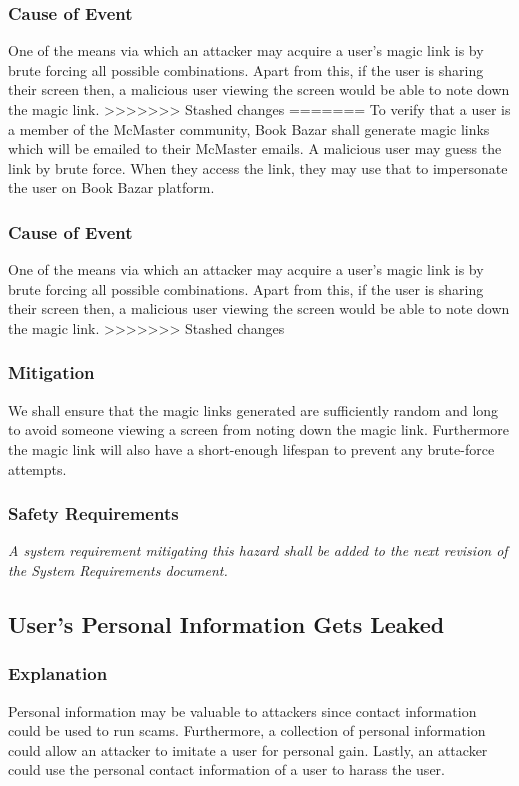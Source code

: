 \documentclass[fullpage]{article}
\begin{document}
\subsubsection*{Cause of Event}
One of the means via which an attacker may acquire a user's magic link is by brute forcing all possible combinations. Apart from this, if the user is sharing their screen then, a malicious user viewing the screen would be able to note down the magic link.
>>>>>>> Stashed changes
=======
To verify that a user is a member of the McMaster community, Book Bazar shall generate magic links which will be emailed to their McMaster emails. A malicious user may guess the link by brute force. When they access the link, they may use that to impersonate the user on Book Bazar platform. 
\subsubsection*{Cause of Event}
One of the means via which an attacker may acquire a user's magic link is by brute forcing all possible combinations. Apart from this, if the user is sharing their screen then, a malicious user viewing the screen would be able to note down the magic link.
>>>>>>> Stashed changes

\subsubsection*{Mitigation}
We shall ensure that the magic links generated are sufficiently random and long to avoid someone viewing a screen from noting down the magic link. Furthermore the magic link will also have a short-enough lifespan to prevent any brute-force attempts.
\subsubsection*{Safety Requirements}
\emph{A system requirement mitigating this hazard shall be added to the next revision of the System Requirements document.}

\subsection{User's Personal Information Gets Leaked}

\subsubsection*{Explanation}
Personal information may be valuable to attackers since contact information could be used to run scams. Furthermore, a collection of personal information could allow an attacker to imitate a user for personal gain. Lastly, an attacker could use the personal contact information of a user to harass the user.
\end{document}

